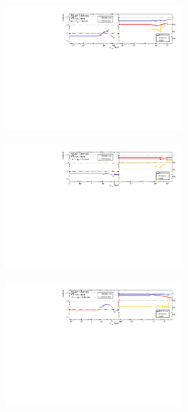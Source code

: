 \begin{figure}[htb]
    \centering 
    \begin{subfigure}{.99\textwidth}\centering
        \includegraphics[width = 0.75\textwidth]{Figures/m4l/UnfoldingStudies/v014_inputs/pt12_m4l60-100inputs.pdf}
    \end{subfigure}
    \begin{subfigure}{.99\textwidth}\centering
        \includegraphics[width = 0.75\textwidth]{Figures/m4l/UnfoldingStudies/v014_inputs/pt12_m4l120-130inputs.pdf}
    \end{subfigure}
    \begin{subfigure}{.99\textwidth}\centering
        \includegraphics[width = 0.75\textwidth]{Figures/m4l/UnfoldingStudies/v014_inputs/pt12_m4l180-2000inputs.pdf}

\end{subfigure}
\end{figure}
